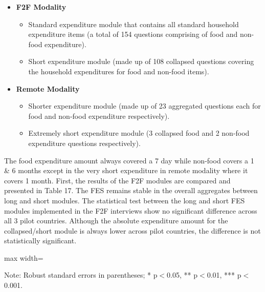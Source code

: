 \documentclass[11pt,harvard]{article}
\begin{document}
	\begin{itemize}[left=1.5em]
		\item\textbf{F2F Modality}
			\begin{itemize}[left=1.75em]
			\item[1.] Standard expenditure module that contains all standard household expenditure items (a total of 154 questions comprising of food and non-food expenditure).
			\item[2.] Short expenditure module (made up of 108 collapsed questions covering the household expenditures for food and non-food items).
			\end{itemize}
		\item\textbf{Remote Modality} 
			\begin{itemize}[left=1.75em]
			\item[1.] Shorter expenditure module (made up of 23 aggregated questions each for food and non-food expenditure respectively).
			\item[2.] Extremely short expenditure module (3 collapsed food and 2 non-food expenditure questions respectively).
		\end{itemize}

	\end{itemize}
	
The food expenditure amount always covered a 7 day while non-food covers a 1 \& 6 months except in the very short expenditure in remote modality where it covers 1 month. First, the results of the F2F modules are compared and presented in Table 17. The FES remains stable in the overall aggregates between long and short modules. The statistical test between the long and short FES modules implemented in the F2F interviews show no significant difference across all 3 pilot countries. Although the absolute expenditure amount for the collapsed/short module is always lower across pilot countries, the difference is not statistically significant. 
	
	\begin{table}[htbp]
		\centering
		\begin{adjustbox}{max width=\textwidth}
			\begin{threeparttable}
				\caption{Impact of Module Length on Expenditure and FES in F2F Surveys}
				\scriptsize
				 
				\label{tab:FES_F2F_Form_Length_All_Country}
				\begin{tablenotes}
					\item Note: Robust standard errors in parentheses; * p$<$0.05, ** p$<$0.01, *** p$<$0.001. 
				\end{tablenotes}
			\end{threeparttable}
		\end{adjustbox}
	\end{table}
	
\end{document}
